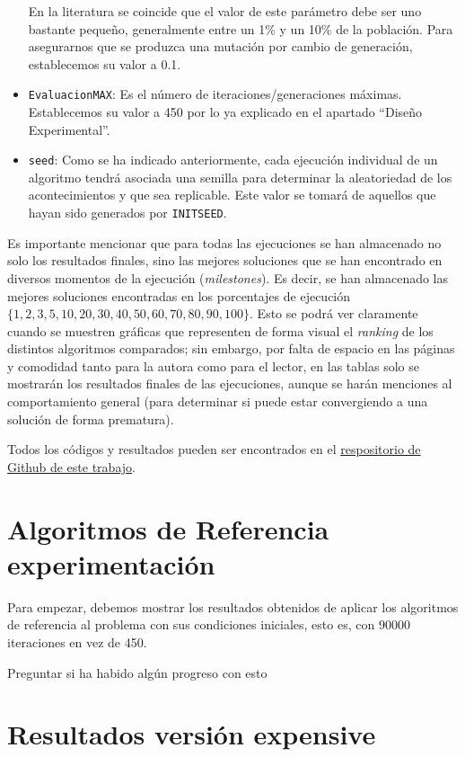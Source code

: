 \begin{itemize}
	En la literatura se coincide que el valor de este parámetro debe ser uno bastante pequeño, generalmente entre un 1\% y un 10\% de la población. 
	Para asegurarnos que se produzca una mutación por cambio de generación, establecemos su valor a 0.1.
	\item \texttt{EvaluacionMAX}: Es el número de iteraciones/generaciones máximas. 
	Establecemos su valor a 450 por lo ya explicado en el apartado ``Diseño Experimental''.
	\item \texttt{seed}: Como se ha indicado anteriormente, cada ejecución individual de un algoritmo tendrá asociada una semilla para determinar la aleatoriedad de los acontecimientos y que sea replicable. 
	Este valor se tomará de aquellos que hayan sido generados por \texttt{INITSEED}.
\end{itemize}

Es importante mencionar que para todas las ejecuciones se han almacenado no solo los resultados finales, sino las mejores soluciones que se han encontrado en diversos momentos de la ejecución (\textit{milestones}). 
Es decir, se han almacenado las mejores soluciones encontradas en los porcentajes de ejecución $\{1,2,3,5,10,20,30,40,50,60,70,80,90,100\}$. 
Esto se podrá ver claramente cuando se muestren gráficas que representen de forma visual el \textit{ranking} de los distintos algoritmos comparados; sin embargo, por falta de espacio en las páginas y comodidad tanto para la autora como para el lector, en las tablas solo se mostrarán los resultados finales de las ejecuciones, aunque se harán menciones al comportamiento general (para determinar si puede estar convergiendo a una solución de forma prematura). 

Todos los códigos y resultados pueden ser encontrados en el \href{https://github.com/Itrilor/TFG/tree/main}{respositorio de Github de este trabajo}. 

\section{Algoritmos de Referencia experimentación}

Para empezar, debemos mostrar los resultados obtenidos de aplicar los algoritmos de referencia al problema con sus condiciones iniciales, esto es, con 90000 iteraciones en vez de 450. 


Preguntar si ha habido algún progreso con esto

\section{Resultados versión expensive}

